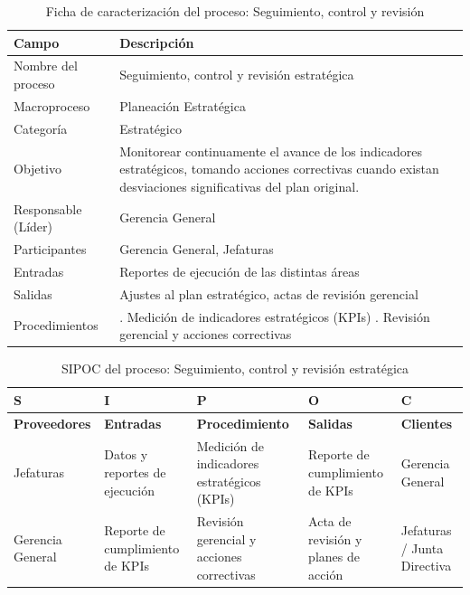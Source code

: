 \documentclass[11pt, a4paper, oneside]{report}
\begin{document}
\begin{table}[H]
\centering\small
\renewcommand{\arraystretch}{1.35}
\setlength{\tabcolsep}{6pt}
\begin{tabularx}{\textwidth}{|>{\raggedright\arraybackslash}p{}|>{\raggedright\arraybackslash}X|}
\hline
\rowcolor{upeu_dark}
\color{white}\bfseries Campo & \color{white}\bfseries Descripción \\ \hline
\rowcolor{gray!10}
Nombre del proceso & Seguimiento, control y revisión estratégica \\ \hline
Macroproceso & Planeación Estratégica \\ \hline
\rowcolor{gray!10}
Categoría & Estratégico \\ \hline
Objetivo & Monitorear continuamente el avance de los indicadores estratégicos, tomando acciones correctivas cuando existan desviaciones significativas del plan original. \\ \hline
\rowcolor{gray!10}
Responsable (Líder) & Gerencia General \\ \hline
Participantes & Gerencia General, Jefaturas \\ \hline
\rowcolor{gray!10}
Entradas & Reportes de ejecución de las distintas áreas \\ \hline
Salidas & Ajustes al plan estratégico, actas de revisión gerencial \\ \hline
\rowcolor{gray!10}
Procedimientos & 1. Medición de indicadores estratégicos (KPIs) \newline 2. Revisión gerencial y acciones correctivas \\ \hline
\end{tabularx}
\caption{Ficha de caracterización del proceso: Seguimiento, control y revisión}
\end{table}

\begin{table}[H]
\centering\small
\renewcommand{\arraystretch}{1.3}
\setlength{\tabcolsep}{4pt}
\begin{tabularx}{\textwidth}{|>{\raggedright\arraybackslash}p{}|>{\raggedright\arraybackslash}p{}|>{\raggedright\arraybackslash}p{}|>{\raggedright\arraybackslash}p{}|>{\raggedright\arraybackslash}X|}
\hline
\rowcolor{upeu_dark}
\color{white}\bfseries S & \color{white}\bfseries I & \color{white}\bfseries P & \color{white}\bfseries O & \color{white}\bfseries C \\ \hline
\rowcolor{upeu_light}
\bfseries Proveedores & \bfseries Entradas & \bfseries Procedimiento & \bfseries Salidas & \bfseries Clientes \\ \hline
Jefaturas &
Datos y reportes de ejecución &
Medición de indicadores estratégicos (KPIs) &
Reporte de cumplimiento de KPIs &
Gerencia General \\ \hline
\rowcolor{gray!10}
Gerencia General &
Reporte de cumplimiento de KPIs &
Revisión gerencial y acciones correctivas &
Acta de revisión y planes de acción &
Jefaturas / Junta Directiva \\ \hline
\end{tabularx}
\caption{SIPOC del proceso: Seguimiento, control y revisión estratégica}
\end{table}
\end{document}
